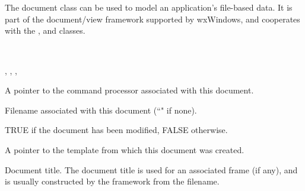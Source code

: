 \section{}\label{wxdocument}

The document class can be used to model an application's file-based
data. It is part of the document/view framework supported by wxWindows,
and cooperates with the , \rtfsp
and  classes.


\\


, ,\rtfsp
{}, 




A pointer to the command processor associated with this document.



Filename associated with this document (``" if none).



TRUE if the document has been modified, FALSE otherwise.



A pointer to the template from which this document was created.



Document title. The document title is used for an associated
frame (if any), and is usually constructed by the framework from
the filename.

\label{documenttypename}

